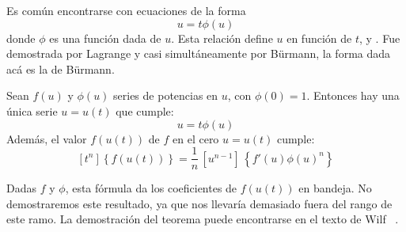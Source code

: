   Es común encontrarse con ecuaciones de la forma
  \begin{equation*}
    u = t \phi(u)
  \end{equation*}
  donde \(\phi\) es una función dada de \(u\).
  Esta relación define \(u\) en función de \(t\),
  y .
  Fue demostrada por Lagrange%
  y casi simultáneamente por Bürmann,%
  la forma dada acá es la de Bürmann.
  \begin{theorem}
    \label{theo:LIF}
    Sean \(f(u)\) y \(\phi(u)\) series de potencias en \(u\),
    con \(\phi(0) = 1\).
    Entonces hay una única serie \(u = u(t)\) que cumple:
    \begin{equation*}
      u = t \phi(u)
    \end{equation*}
    Además,
    el valor \(f(u(t))\) de \(f\) en el cero \(u = u(t)\)
    cumple:
    \begin{equation*}
      \left[ t^n \right] \left\{ f(u(t)) \right\}
         = \frac{1}{n} \, \left[ u^{n - 1} \right] \,
                            \left\{ f'(u) \phi(u)^n \right\}
    \end{equation*}
  \end{theorem}
  Dadas \(f\) y \(\phi\),
  esta fórmula da los coeficientes de \(f(u(t))\) en bandeja.
  No demostraremos este resultado,
  ya que nos llevaría demasiado fuera del rango de este ramo.
  La demostración del teorema puede encontrarse en el texto de Wilf~%
    \cite{wilf06:_gfology}.




